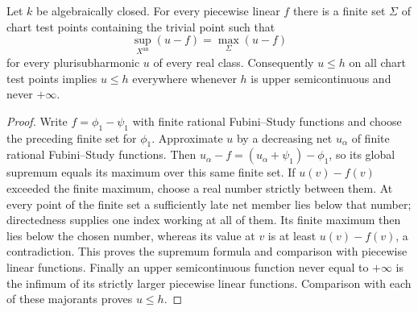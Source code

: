 \begin{theorem}
\label{thm:c0n-chart-test-comparison}
\leanok
Let $k$ be algebraically closed.  For every piecewise linear $f$ there is
a finite set $\Sigma$ of chart test points containing the trivial point
such that
\[
 \sup_{X^{\mathrm{an}}}(u-f)=\max_\Sigma(u-f)
\]
for every plurisubharmonic $u$ of every real class.
Consequently $u\le h$ on all chart test points implies $u\le h$
everywhere whenever $h$ is upper semicontinuous and never $+\infty$.
\end{theorem}
\begin{proof}
Write $f=\phi_1-\psi_1$ with finite rational Fubini--Study functions and
choose the preceding finite set for $\phi_1$.
Approximate $u$ by a decreasing net $u_\alpha$ of finite rational
Fubini--Study functions.  Then
$u_\alpha-f=(u_\alpha+\psi_1)-\phi_1$, so its global supremum equals
its maximum over this same finite set.
If $u(v)-f(v)$ exceeded the finite maximum, choose a real number strictly
between them.  At every point of the finite set a sufficiently late
net member lies below that number; directedness supplies one index
working at all of them.  Its finite maximum then lies below the chosen
number, whereas its value at $v$ is at least $u(v)-f(v)$, a contradiction.
This proves the supremum formula and comparison with piecewise linear
functions.  Finally an upper semicontinuous function never equal to
$+\infty$ is the infimum of its strictly larger piecewise linear
functions.  Comparison with each of these majorants proves $u\le h$.
\end{proof}

